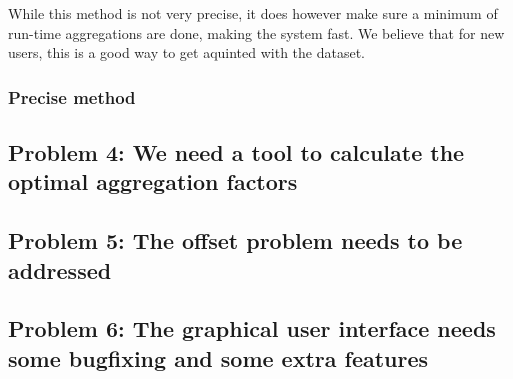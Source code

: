 
While this method is not very precise, it does however make sure a minimum of run-time aggregations are done, making the system fast. We believe that for new users, this is a good way to get aquinted with the dataset.

\subsubsection{Precise method}

\subsection{Problem 4: We need a tool to calculate the optimal aggregation factors}
\subsection{Problem 5: The offset problem needs to be addressed}
\subsection{Problem 6: The graphical user interface needs some bugfixing and some extra features}